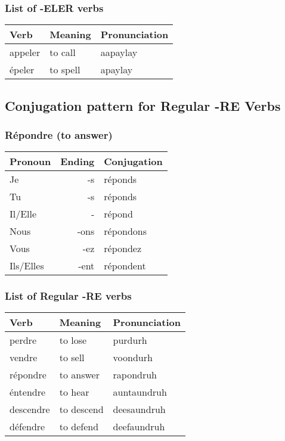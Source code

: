 \subsubsection{List of -ELER verbs}
\begin{longtable}{| l | l | l |}
\hline
Verb 		& Meaning 		& Pronunciation	\\
\hline
\endhead
appeler 	& to call		& aapaylay	\\
\'epeler 	& to spell		& apaylay	\\
\hline
\end{longtable}

\subsection{Conjugation pattern for Regular -RE Verbs}

\subsubsection{R\'epondre (to answer)}
\begin{tabular}{| l | r | l |}
\hline
Pronoun 	& 	Ending 	& 	Conjugation	\\ 	\hline
Je		    &	-s	    & 	r\'eponds   \\ 	\hline
Tu		    &	-s	    &	r\'eponds   \\	\hline
Il/Elle		&	-	    &	r\'epond    \\	\hline
Nous		&	-ons	&	r\'epondons \\	\hline
Vous		&	-ez	    &	r\'epondez  \\	\hline
Ils/Elles	&	-ent	&	r\'epondent \\	\hline
\end{tabular}

\subsubsection{List of Regular -RE verbs}
\begin{longtable}{| l | l | l |}
\hline
Verb 		& Meaning 		& Pronunciation	\\
\hline
\endhead
perdre      & to lose       & purdurh       \\ 	\hline
vendre      & to sell       & voondurh      \\	\hline
r\'epondre  & to answer     & rapondruh     \\	\hline
\'entendre  & to hear       & auntaundruh   \\	\hline
descendre   & to descend    & deesaundruh   \\	\hline
d\'efendre   & to defend     & deefaundruh   \\	\hline
\end{longtable}

